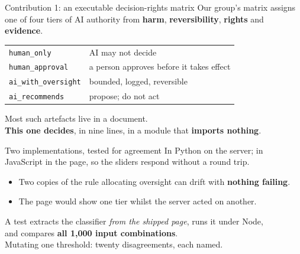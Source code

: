 \documentclass[aspectratio=169,11pt]{beamer}
\begin{document}
\begin{frame}{Contribution 1: an executable decision-rights matrix}
  \vspace{.8em}
  Our group's matrix assigns one of four tiers of AI authority from
  \textbf{harm}, \textbf{reversibility}, \textbf{rights} and \textbf{evidence}.
  \vspace{1em}
  \begin{center}
  \begin{tabular}{ll}
    \toprule
    \texttt{human\_only}         & AI may not decide \\
    \texttt{human\_approval}     & a person approves before it takes effect \\
    \texttt{ai\_with\_oversight} & bounded, logged, reversible \\
    \texttt{ai\_recommends}      & propose; do not act \\
    \bottomrule
  \end{tabular}
  \end{center}
  \vspace{1.2em}
  \pause
  \begin{center}
    Most such artefacts live in a document.\\
    \textbf{This one decides}, in nine lines, in a module that
    \textbf{imports nothing}.
  \end{center}
\end{frame}

\begin{frame}{Two implementations, tested for agreement}
  \vspace{1em}
  In Python on the server; in JavaScript in the page, so the sliders respond
  without a round trip.
  \vspace{1em}
  \begin{itemize}\setlength\itemsep{.55em}
    \item Two copies of the rule allocating oversight can drift with
      \textbf{nothing failing}.
    \item The page would show one tier whilst the server acted on another.
  \end{itemize}
  \vspace{1.2em}
  \pause
  \begin{center}
    A test extracts the classifier \emph{from the shipped page}, runs it under
    Node,\\ and compares \textbf{all 1{,}000 input combinations}.
    \\[.5em]
    {\color{muted}\small Mutating one threshold: twenty disagreements, each named.}
  \end{center}
\end{frame}
\end{document}
